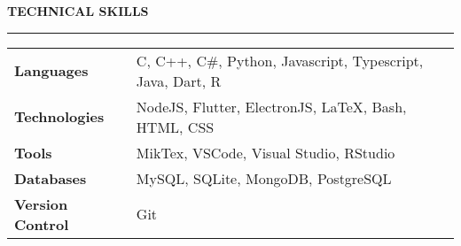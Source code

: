 \noindent\textcolor{themecolor}{\textbf{TECHNICAL SKILLS}}

\vspace{2mm}
\hrule

\begin{table}[h]
\begin{tabular}{ >{\bfseries} l l }
    Languages & C, C++, C\#, Python, Javascript, Typescript, Java, Dart, R\\
    Technologies & NodeJS, Flutter, ElectronJS, \LaTeX, Bash, HTML, CSS\\
    Tools & MikTex, VSCode, Visual Studio, RStudio\\
    Databases & MySQL, SQLite, MongoDB, PostgreSQL\\
    Version Control & Git
\end{tabular}
\end{table}
